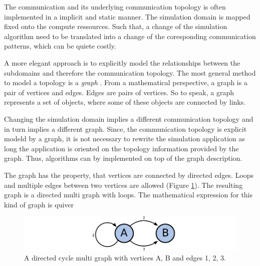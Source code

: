 The communication and its underlying communication topology is often
implemented in a implicit and static manner. The simulation domain is
mapped fixed onto the compute ressources.  Such that, a change of the
simulation algorithm need to be translated into a change of the
coresponding communication patterns, which can be quiete costly.

A more elegant approach is to explicitly model the relationships
between the subdomains and therefore the communication topology. The
most general method to model a topology is a \textit{graph}
\cite{ref:graph}.  From a mathematical perspective, a graph is a pair
of vertices and edges. Edges are pairs of vertices. So to speak, a
graph represents a set of objects, where some of these objects are
connected by links.

Changing the simulation domain implies a different communication
topology and in turn implies a different graph.  Since, the
communication topology is explicit modeld by a graph, it is not
necessary to rewrite the simulation application as long the
application is oriented on the topology information provided by the
graph. Thus, algorithms can by implemented on top of the graph
description.


The graph has the property, that vertices are connected by directed edges. Loops
and multiple edges between two vertices are allowed (Figure
\ref{fig:graph}). The resulting graph is a directed multi graph with
loops. The mathematical expression for this kind of graph is quiver
\cite{ref:quiver}

\begin{figure}[H]
  \centering \includegraphics[width=\textwidth]{graphics/30_graph}
  \caption{ A directed cycle multi graph with vertices A, B and edges
    1, 2, 3.  }
  \label{fig:graph}
\end{figure}


